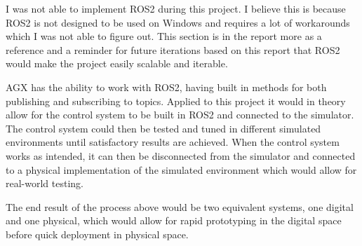 I was not able to implement ROS2 during this project. I believe this is because ROS2 is not designed to be used on Windows and requires a lot of workarounds which I was not able to figure out. This section is in the report more as a reference and a reminder for future iterations based on this report that ROS2 would make the project easily scalable and iterable. 

AGX has the ability to work with ROS2, having built in methods for both publishing and subscribing to topics. Applied to this project it would in theory allow for the control system to be built in ROS2 and connected to the simulator. The control system could then be tested and tuned in different simulated environments until satisfactory results are achieved. When the control system works as intended, it can then be disconnected from the simulator and connected to a physical implementation of the simulated environment which would allow for real-world testing. 

The end result of the process above would be two equivalent systems, one digital and one physical, which would allow for rapid prototyping in the digital space before quick deployment in physical space. 

